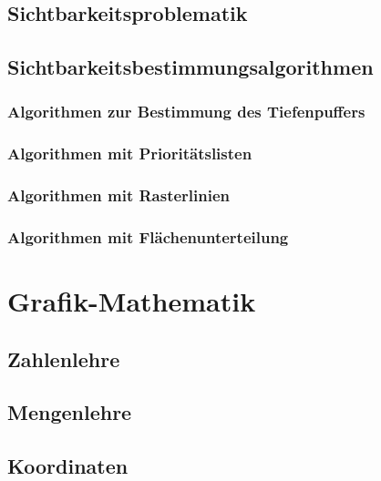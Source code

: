 \section{Sichtbarkeitsproblematik}
\section{Sichtbarkeitsbestimmungsalgorithmen}
\subsection{Algorithmen zur Bestimmung des Tiefenpuffers}
\subsection{Algorithmen mit Prioritätslisten}
\subsection{Algorithmen mit Rasterlinien}
\subsection{Algorithmen mit Flächenunterteilung}

\chapter{Grafik-Mathematik}
\section{Zahlenlehre}
\section{Mengenlehre}
\section{Koordinaten}
